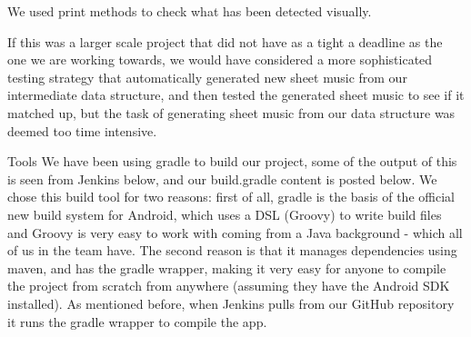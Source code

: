                                                             We used print methods to check what has been detected visually.


                                                            If this was a larger scale project that did not have as a tight a deadline as the one we are working towards, we would have considered a more sophisticated testing strategy that automatically generated new sheet music from our intermediate data structure, and then tested the generated sheet music to see if it
                                                            matched up, but the task of generating sheet music from our data structure was deemed too time intensive.
                                                             
                                                             Tools
                                                             We have been using gradle to build our project, some of the output of this is seen from Jenkins below, and our build.gradle content is posted below. We chose this build tool for two reasons: first of all, gradle is the basis of the official new build system for Android, which uses a DSL (Groovy) to write build
                                                             files and Groovy is very easy to work with coming from a Java background - which all of us in the team have. The second reason is that it manages dependencies using maven, and has the gradle wrapper, making it very easy for anyone to compile the project from scratch from anywhere (assuming they have the
                                                             Android SDK installed). As mentioned before, when Jenkins pulls from our GitHub repository it runs the gradle wrapper to compile the app. 
                                                             
